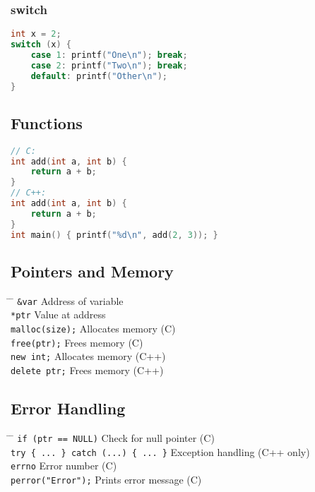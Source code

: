 \documentclass[a4paper,10pt]{article}
\begin{document}
\subsubsection*{switch}
\begin{lstlisting}[language=C]
int x = 2;
switch (x) {
    case 1: printf("One\n"); break;
    case 2: printf("Two\n"); break;
    default: printf("Other\n");
}
\end{lstlisting}

\subsection{Functions}
\begin{lstlisting}[language=C]
// C:
int add(int a, int b) {
    return a + b;
}
// C++:
int add(int a, int b) {
    return a + b;
}
int main() { printf("%d\n", add(2, 3)); }
\end{lstlisting}

\subsection{Pointers and Memory}
\begin{tabbing}
	\= \hspace{30mm} \= \hspace{50mm} \kill
	\> \verb|&var| \> Address of variable \\
	\> \verb|*ptr| \> Value at address \\
	\> \verb|malloc(size);| \> Allocates memory (C) \\
	\> \verb|free(ptr);| \> Frees memory (C) \\
	\> \verb|new int;| \> Allocates memory (C++) \\
	\> \verb|delete ptr;| \> Frees memory (C++) \\
\end{tabbing}

\subsection{Error Handling}
\begin{tabbing}
	\= \hspace{30mm} \= \hspace{50mm} \kill
	\> \verb|if (ptr == NULL)| \> Check for null pointer (C) \\
	\> \verb|try { ... } catch (...) { ... }| \> Exception handling (C++ only) \\
	\> \verb|errno| \> Error number (C) \\
	\> \verb|perror("Error");| \> Prints error message (C) \\
\end{tabbing}
\end{document}
